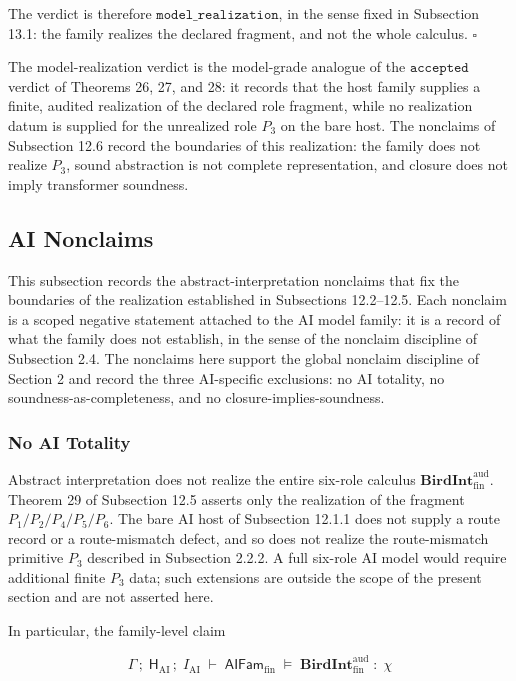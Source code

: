 \documentclass[11pt]{article}
\theoremstyle{definition}
\begin{document}
The verdict is therefore \(\texttt{model\_realization}\), in the sense fixed in Subsection 13.1: the family realizes the declared fragment, and not the whole calculus. \(\square\)

The model-realization verdict is the model-grade analogue of the \(\texttt{accepted}\) verdict of Theorems 26, 27, and 28: it records that the host family supplies a finite, audited realization of the declared role fragment, while no realization datum is supplied for the unrealized role \(P_3\) on the bare host. The nonclaims of Subsection 12.6 record the boundaries of this realization: the family does not realize \(P_3\), sound abstraction is not complete representation, and closure does not imply transformer soundness.

\subsection{AI Nonclaims}

This subsection records the abstract-interpretation nonclaims that fix the boundaries of the realization established in Subsections 12.2--12.5. Each nonclaim is a scoped negative statement attached to the AI model family: it is a record of what the family does not establish, in the sense of the nonclaim discipline of Subsection 2.4. The nonclaims here support the global nonclaim discipline of Section 2 and record the three AI-specific exclusions: no AI totality, no soundness-as-completeness, and no closure-implies-soundness.

\subsubsection{No AI Totality}

Abstract interpretation does not realize the entire six-role calculus \(\mathbf{BirdInt}^{\mathrm{aud}}_{\mathrm{fin}}\). Theorem 29 of Subsection 12.5 asserts only the realization of the fragment \(P_1/P_2/P_4/P_5/P_6\). The bare AI host of Subsection 12.1.1 does not supply a route record or a route-mismatch defect, and so does not realize the route-mismatch primitive \(P_3\) described in Subsection 2.2.2. A full six-role AI model would require additional finite \(P_3\) data; such extensions are outside the scope of the present section and are not asserted here.

In particular, the family-level claim

\[
\Gamma\,;\;\mathsf H_{\mathrm{AI}}\,;\;I_{\mathrm{AI}}\;\vdash\;\mathsf{AIFam}_{\mathrm{fin}}\;\models\;\mathbf{BirdInt}^{\mathrm{aud}}_{\mathrm{fin}}\;:\;\chi
\]
\end{document}
